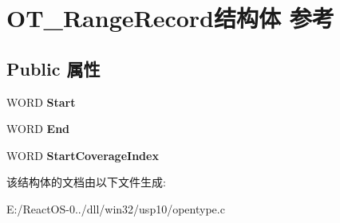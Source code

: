 \hypertarget{struct_o_t___range_record}{}\section{O\+T\+\_\+\+Range\+Record结构体 参考}
\label{struct_o_t___range_record}
\subsection*{Public 属性}
\begin{DoxyCompactItemize}
\item 
\mbox{\label{struct_o_t___range_record_afd7a5678a179c966e6e660fd6da93270}} 
W\+O\+RD {\bfseries Start}
\item 
\mbox{\label{struct_o_t___range_record_af557820855005de0c8e70c1246a52cb2}} 
W\+O\+RD {\bfseries End}
\item 
\mbox{\label{struct_o_t___range_record_aa66c7f4fca7356098692b7ff8cd52373}} 
W\+O\+RD {\bfseries Start\+Coverage\+Index}
\end{DoxyCompactItemize}


该结构体的文档由以下文件生成\+:\begin{DoxyCompactItemize}
\item 
E\+:/\+React\+O\+S-\/0../dll/win32/usp10/opentype.\+c\end{DoxyCompactItemize}

